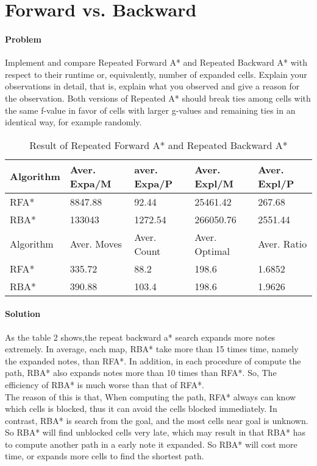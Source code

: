\section{Forward vs. Backward}

\paragraph{Problem}
Implement and compare Repeated Forward A* and Repeated Backward A* with respect
to their runtime or, equivalently, number of expanded cells. Explain your
observations in detail, that is, explain what you observed and give a reason
for the observation. Both versions of Repeated A* should break ties among cells
with the same f-value in favor of cells with larger g-values and remaining ties
in an identical way, for example randomly.



\begin{table}[h!]
\centering
\caption{Result of Repeated Forward A* and Repeated Backward A*}
\begin{tabular}{|l|l|l|l|l|}
\hline
Algorithm & Aver. Expa/M & aver. Expa/P & Aver. Expl/M & Aver. Expl/P \\
\hline
RFA* & 8847.88 & 92.44 & 25461.42 & 267.68 \\
\hline
RBA* & 133043 & 1272.54 & 266050.76 & 2551.44 \\
\hhline{|=|=|=|=|=|}
Algorithm & Aver. Moves & Aver. Count & Aver. Optimal & Aver. Ratio \\
\hline
RFA* & 335.72 & 88.2 & 198.6 & 1.6852 \\
\hline
RBA* & 390.88 & 103.4 & 198.6 & 1.9626 \\
\hline
\end{tabular}
\label{tbl:rpa-rba}
\end{table}


\paragraph{Solution}
As the table 2 shows,the repeat backward a* search expands more notes extremely. In average, each map, RBA* take more than 15 times time, namely the expanded notes, than RFA*. In addition, in each procedure of compute the path, RBA* also expands notes more than 10 times than RFA*. So, The efficiency of RBA* is much worse than that of RFA*.\\ 
The reason of this is that, When computing the path, RFA* always can know which cells is blocked, thus it can avoid the cells blocked immediately. In contrast, RBA* is search from the goal, and the most cells near goal is unknown. So RBA* will find unblocked cells very late, which may result in that RBA* has to compute another path in a early note it expanded. So RBA* will cost more time, or expands more cells to find the shortest path.\\

